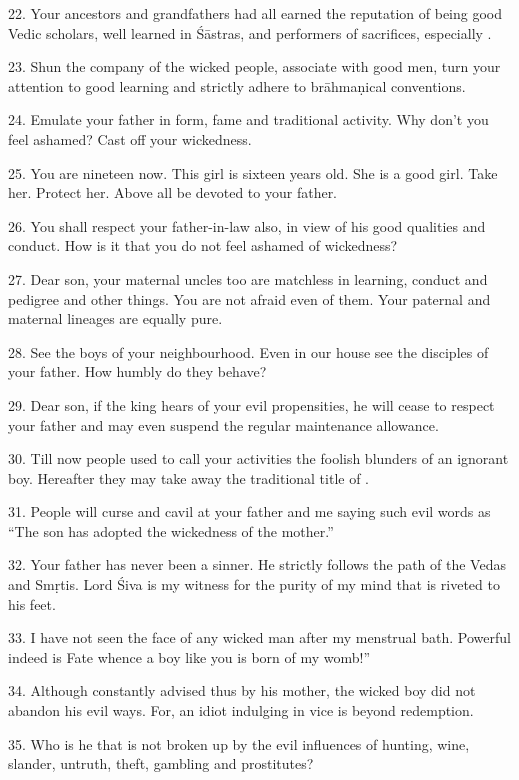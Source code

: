 22. Your ancestors and grandfathers had all earned the reputation of being good
Vedic scholars, well learned in Śāstras, and performers of sacrifices,
especially .

23. Shun the company of the wicked people, associate with good men, turn your
attention to good learning and strictly adhere to brāhmaṇical conventions.

24. Emulate your father in form, fame and traditional activity. Why don’t you
feel ashamed? Cast off your wickedness.

25. You are nineteen now. This girl is sixteen years old. She is a good girl.
Take her. Protect her. Above all be devoted to your father.

26. You shall respect your father-in-law also, in view of his good qualities and
conduct. How is it that you do not feel ashamed of wickedness?

27. Dear son, your maternal uncles too are matchless in learning, conduct and
pedigree and other things. You are not afraid even of them. Your paternal and
maternal lineages are equally pure.

28. See the  boys of your neighbourhood. Even in our house see
the disciples of your father. How humbly do they behave?

29. Dear son, if the king hears of your evil propensities, he will cease to
respect your father and may even suspend the regular maintenance allowance.

30. Till now people used to call your activities the foolish blunders of an
ignorant boy. Hereafter they may take away the traditional title of .

31. People will curse and cavil at your father and me saying such evil words as
“The son has adopted the wickedness of the mother.”

32. Your father has never been a sinner. He strictly follows the path of
the Vedas and Smṛtis. Lord Śiva is my witness for the purity of my mind that is
riveted to his feet.

33. I have not seen the face of any wicked man after my menstrual bath. Powerful
indeed is Fate whence a boy like you is born of my womb!”

34. Although constantly advised thus by his mother, the wicked boy did not
abandon his evil ways. For, an idiot indulging in vice is beyond redemption.

35. Who is he that is not broken up by the evil influences of hunting, wine,
slander, untruth, theft, gambling and prostitutes?

